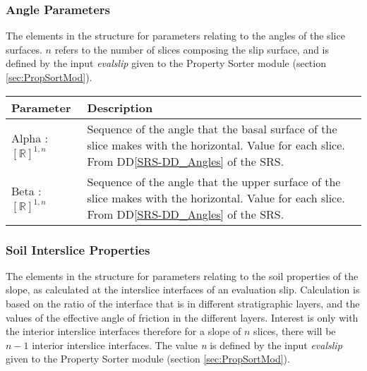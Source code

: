 \documentclass[12pt, titlepage]{article}
\begin{document}
\subsubsection{Angle Parameters} \label{Tbl:AngleParam}
\noindent
The elements in the structure for parameters relating to the angles of
the slice surfaces. $n$ refers to the number of slices composing the
slip surface, and is defined by the input \textit{evalslip} given to
the Property Sorter module (section \ref{sec:PropSortMod}).

\begin{center}
\begin{longtable}{ p{}
    p{}}\hline 
  \textbf{Parameter} & \textbf{Description}\\ \hline

  Alpha : $[\mathbb{R}]^{1,n}$ & Sequence of the angle that the basal
  surface of the slice makes with the horizontal. Value for each
  slice. From DD\ref{SRS-DD_Angles} of the SRS.\\

  Beta : $[\mathbb{R}]^{1,n}$ & Sequence of the angle that the upper
  surface of the slice makes with the horizontal. Value for each
  slice. From DD\ref{SRS-DD_Angles} of the SRS.\\ \hline
\end{longtable}
\end{center}

\subsubsection{Soil Interslice Properties} \label{Tbl:SoilIntParam}
The elements in the structure for parameters relating to the soil
properties of the slope, as calculated at the interslice interfaces of
an evaluation slip. Calculation is based on the ratio of the interface
that is in different stratigraphic layers, and the values of the
effective angle of friction in the different layers. Interest is only
with the interior interslice interfaces therefore for a slope of $n$
slices, there will be $n-1$ interior interslice interfaces. The value
\textit{n} is defined by the input \textit{evalslip} given to the
Property Sorter module (section \ref{sec:PropSortMod}).
\end{document}
